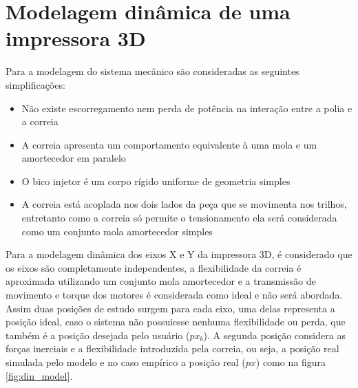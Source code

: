 





\section{Modelagem dinâmica de uma impressora 3D}
Para a modelagem do sistema mecânico são consideradas as seguintes simplificações:
\begin{itemize}
    \item Não existe escorregamento nem perda de potência na interação entre a polia e a correia
    \item A correia apresenta um comportamento equivalente à uma mola e um amortecedor em paralelo
    \item O bico injetor é um corpo rígido uniforme de geometria simples
    \item A correia está acoplada nos dois lados da peça que se movimenta nos trilhos, entretanto como a correia só permite o tensionamento ela será considerada como um conjunto mola amortecedor simples
\end{itemize}

Para a modelagem dinâmica dos eixos X e Y da impressora 3D, 
é considerado que os eixos são completamente independentes, 
a flexibilidade da correia é aproximada utilizando um conjunto 
mola amortecedor e a transmissão de movimento e torque dos 
motores é considerada como ideal e não será abordada.
Assim duas posições de estudo surgem para cada eixo, uma delas 
representa a posição ideal, caso o sistema não possuiesse nenhuma flexibilidade
ou perda, que também é a posição desejada pelo usuário ($px_b$). 
A segunda posição considera as forças inerciais e a 
flexibilidade introduzida pela correia, ou seja, a posição real simulada pelo modelo
e no caso empírico a posição real ($px$) como na figura \ref{fig:din_model}.


